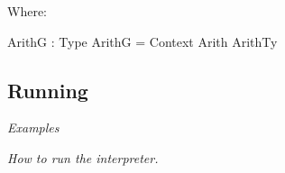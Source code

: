 \noindent
Where:
\begin{code}
ArithG : Type
ArithG = Context Arith ArithTy
\end{code}


\subsection{Running}
\label{sec:denote:running}

\begin{center}
  \large\em Examples
\end{center}

\begin{center}
  \large\em How to run the interpreter.
\end{center}


